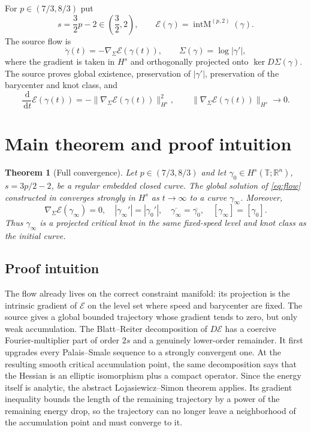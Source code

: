 \documentclass[11pt]{article}
\newtheorem{theorem}{Theorem}
\theoremstyle{remark}
\newcommand{\T}{\mathbb T}
\newcommand{\R}{\mathbb R}
\newcommand{\E}{\mathcal E}
\newcommand{\dd}{\,\mathrm d}
\newcommand{\IntM}{\operatorname{intM}^{(p,2)}}
\begin{document}
For $p\in(7/3,8/3)$ put
\[
 s=\frac32p-2\in\left(\frac32,2\right),\qquad
 \E(\gamma)=\IntM(\gamma).
\]
The source flow is
\begin{equation}\label{eq:flow}
 \dot\gamma(t)=-\nabla_{\Sigma}\E(\gamma(t)),\qquad
 \Sigma(\gamma)=\log|\gamma'|,
\end{equation}
where the gradient is taken in $H^s$ and orthogonally projected onto
$\ker D\Sigma(\gamma)$.  The source proves global existence, preservation of
$|\gamma'|$, preservation of the barycenter and knot class, and
\begin{equation}\label{eq:source-decay}
 \frac{\dd}{\dd t}\E(\gamma(t))
 =-\|\nabla_\Sigma\E(\gamma(t))\|_{H^s}^{2},\qquad
 \|\nabla_\Sigma\E(\gamma(t))\|_{H^s}\longrightarrow0.
\end{equation}

\section{Main theorem and proof intuition}

\begin{theorem}[Full convergence]\label{thm:main}
Let $p\in(7/3,8/3)$ and let
$\gamma_0\in H^s(\T;\R^n)$, $s=3p/2-2$, be a regular embedded closed
curve.  The global solution of \eqref{eq:flow} constructed in \cite{KSSM}
converges strongly in $H^s$ as $t\to\infty$ to a curve $\gamma_\infty$.
Moreover,
\[
 \nabla_\Sigma\E(\gamma_\infty)=0,
 \quad |\gamma_\infty'|=|\gamma_0'|,
 \quad \overline{\gamma_\infty}=\overline{\gamma_0},
 \quad [\gamma_\infty]=[\gamma_0].
\]
Thus $\gamma_\infty$ is a projected critical knot in the same fixed-speed
level and knot class as the initial curve.
\end{theorem}

\subsection*{Proof intuition}

The flow already lives on the correct constraint manifold: its projection is
the intrinsic gradient of $\E$ on the level set where speed and barycenter are
fixed.  The source gives a global bounded trajectory whose gradient tends to
zero, but only weak accumulation.  The Blatt--Reiter decomposition of
$D\E$ has a coercive Fourier-multiplier part of order $2s$ and a genuinely
lower-order remainder.  It first upgrades every Palais--Smale sequence to a
strongly convergent one.  At the resulting smooth critical accumulation point,
the same decomposition says that the Hessian is an elliptic isomorphism plus a
compact operator.  Since the energy itself is analytic, the abstract
Lojasiewicz--Simon theorem applies.  Its gradient inequality bounds the length
of the remaining trajectory by a power of the remaining energy drop, so the
trajectory can no longer leave a neighborhood of the accumulation point and
must converge to it.
\end{document}

